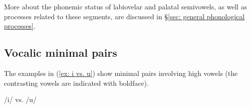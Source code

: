     \z
\z

More about the phonemic status of labiovelar and palatal semivowels, as well as processes related to these segments, are discussed in §\ref{sec: general phonological processes}.

\subsection{Vocalic minimal pairs}
\label{subsec: minimal pairs vowels}

The examples in (\ref{ex: i vs. u}) show minimal pairs involving high vowels (the contrasting vowels are indicated with boldface).

\ea\label{ex: i vs. u}
{/i/ vs. /u/}

